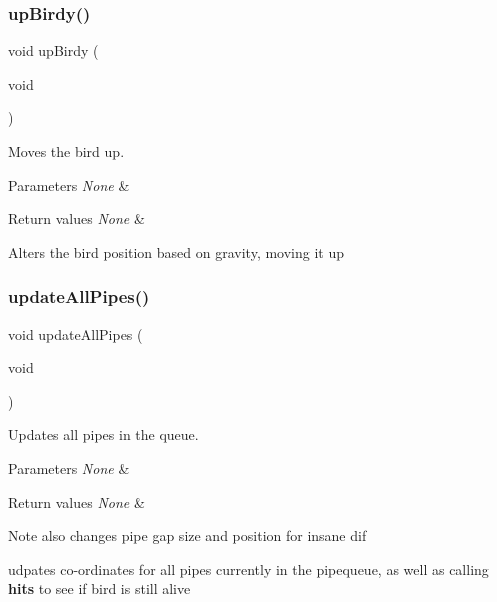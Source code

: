 \subsubsection{\texorpdfstring{up\+Birdy()}{upBirdy()}}
{\footnotesize\ttfamily void up\+Birdy (\begin{DoxyParamCaption}\item[{void}]{ }\end{DoxyParamCaption})}



Moves the bird up. 


\begin{DoxyParams}{Parameters}
{\em None} & \\
\hline
\end{DoxyParams}

\begin{DoxyRetVals}{Return values}
{\em None} & \\
\hline
\end{DoxyRetVals}
Alters the bird position based on gravity, moving it up \mbox{\label{group___flappy___bird_gab3c978c3d1d01f63bb632d6f49ed9c20}} 
\subsubsection{\texorpdfstring{update\+All\+Pipes()}{updateAllPipes()}}
{\footnotesize\ttfamily void update\+All\+Pipes (\begin{DoxyParamCaption}\item[{void}]{ }\end{DoxyParamCaption})}



Updates all pipes in the queue. 


\begin{DoxyParams}{Parameters}
{\em None} & \\
\hline
\end{DoxyParams}

\begin{DoxyRetVals}{Return values}
{\em None} & \\
\hline
\end{DoxyRetVals}
\begin{DoxyNote}{Note}
also changes pipe gap size and position for insane dif
\end{DoxyNote}
udpates co-\/ordinates for all pipes currently in the pipequeue, as well as calling {\bfseries hits} to see if bird is still alive \mbox{\label{group___flappy___bird_ga54cf26cd9679c160760e7f03f4ac2e93}} 

